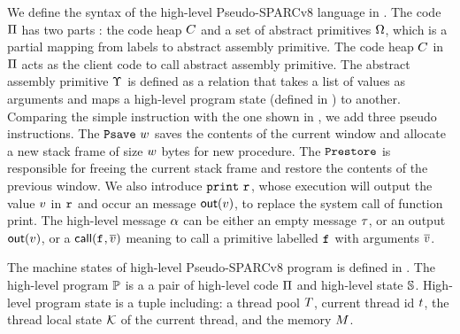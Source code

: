 We define the syntax of the high-level Pseudo-SPARCv8 language 
in \Fig{\ref{fig:syntax-of-concur-pseudo-sparc}}. 
The code $\Pi$ has two parts : 
the code heap $C$ 
and a set of abstract primitives $\Omega$, 
which is a partial mapping from labels to 
abstract assembly primitive. The code heap $C$ in $\Pi$ 
acts as the client code to 
call abstract assembly primitive. 
The abstract assembly primitive $\Upsilon$ 
is defined as a relation that takes a list of values 
as arguments and maps a high-level program state 
(defined in \Fig{\ref{fig:machine-state-concur-pseudo-sparc}}) 
to another. 
Comparing the simple instruction with the one shown in 
\Fig{\ref{fig:Machine States and Language for SPARC Code}}, 
we add three pseudo instructions. The $\texttt{Psave} \ w$ 
saves the contents of the current window and 
allocate a new stack frame of size $w$ bytes for new procedure. 
The $\texttt{Prestore}$ is responsible for 
freeing the current stack frame and 
restore the contents of the previous window. 
We also introduce $\texttt{print} \ \texttt{r}_{}$, 
whose execution will output the value $v$ in $\texttt{r}_{}$ and 
occur an message $\textsf{out}({v})$, 
to replace the system call of function print. 
The high-level message 
$\alpha$ can be either an empty message $\tau$, or an output 
$\textsf{out}({v})$, or a $\textsf{call}({\texttt{f}_{}, \overline{v}})$ meaning to 
call a primitive labelled $\texttt{f}_{}$ with arguments $\overline{v}$. 

The machine states of high-level Pseudo-SPARCv8 program 
is defined in \Fig{\ref{fig:machine-state-concur-pseudo-sparc}}. 
The high-level program $\mathbb{P}$ is a a pair of high-level code 
$\Pi$ and high-level state $\mathbb{S}$. High-level program 
state is a tuple including: a thread pool $T$, 
current thread id $t$, the thread local state 
$\mathcal{K}$ of the current thread, and the memory $M$.

